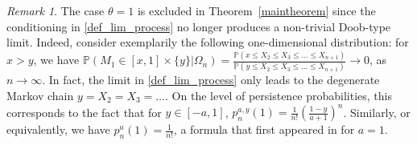 \documentclass[12pt]{article}
\renewcommand{\P}{\mathbb{P}} %
\newcommand{\1}{\mathds{1}}
\theoremstyle{definition}
\theoremstyle{plain}
\theoremstyle{remark}
\newtheorem{Remark}{Remark}
\begin{document}
\begin{Remark}
    The case $\theta=1$ is excluded in Theorem~\ref{maintheorem} since the conditioning in \eqref{def_lim_process} no longer produces a non-trivial Doob-type limit. Indeed, consider exemplarily the following one-dimensional distribution: for $x>y$, we have $\P(M_1\in[x,1]\times\{y\}|\Omega_n) = \frac{\P( x\leq X_2\leq X_3\leq \ldots\leq X_{n+1})}{\P( y\leq X_2\leq X_3\leq \ldots \leq X_{n+1})}\to 0$, as $n\to\infty$. In fact, the limit in \eqref{def_lim_process} only leads to the degenerate Markov chain $y=X_2=X_3=\ldots$. On the level of persistence probabilities, this corresponds to the fact that for $y\in[-a,1]$, $p_n^{a,y}(1)=\frac{1}{n!}\left(\frac{1-y}{a+1}\right)^n$. Similarly, or equivalently, we have $p_n^a(1)=\frac{1}{n!}$, a formula that first appeared in \cite{12,15} for $a=1$.
\end{Remark}
\end{document}
